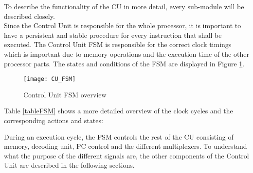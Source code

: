 To describe the functionality of the CU in more detail, every sub-module will be described closely.\\
Since the Control Unit is responsible for the whole processor, it is important to have a persistent and stable procedure for every instruction that shall be executed. The Control Unit \ac{FSM} is responsible for the correct clock timings which is important due to memory operations and the execution time of the other processor parts. The states and conditions of the FSM are displayed in Figure \ref{fig:cufsm}. 

\begin{figure}[H]
	\centering
	\texttt{[image: CU\_FSM]}
	\caption{Control Unit FSM overview}
	\label{fig:cufsm}
\end{figure}

Table \ref{tableFSM} shows a more detailed overview of the clock cycles and the corresponding actions and states:\\

\begin{table}[h]
\caption{Timing of FSM}
\label{tableFSM}
\end{table}

During an execution cycle, the FSM controls the rest of the CU consisting of memory, decoding unit, PC control and the different multiplexers. To understand what the purpose of the different signals are, the other components of the Control Unit are described in the following sections.


